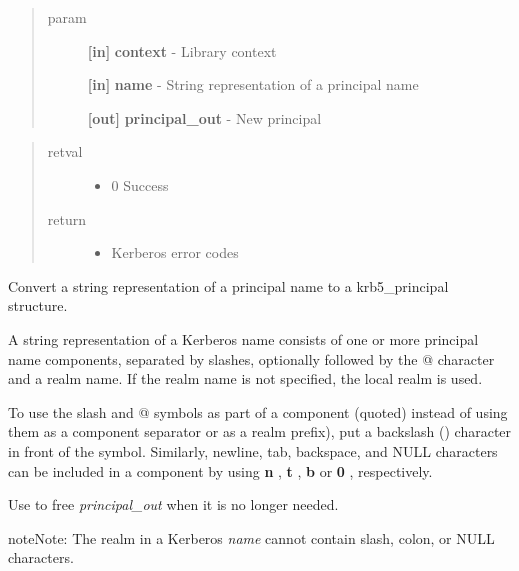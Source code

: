 \documentclass[letterpaper,10pt,english]{sphinxmanual}
\begin{document}
\begin{quote}\begin{description}
\item[{param}] \leavevmode
\textbf{{[}in{]}} \textbf{context} - Library context

\textbf{{[}in{]}} \textbf{name} - String representation of a principal name

\textbf{{[}out{]}} \textbf{principal\_out} - New principal

\end{description}\end{quote}
\begin{quote}\begin{description}
\item[{retval}] \leavevmode\begin{itemize}
\item {} 
0   Success

\end{itemize}

\item[{return}] \leavevmode\begin{itemize}
\item {} 
Kerberos error codes

\end{itemize}

\end{description}\end{quote}

Convert a string representation of a principal name to a krb5\_principal structure.

A string representation of a Kerberos name consists of one or more principal name components, separated by slashes, optionally followed by the @ character and a realm name. If the realm name is not specified, the local realm is used.

To use the slash and @ symbols as part of a component (quoted) instead of using them as a component separator or as a realm prefix), put a backslash () character in front of the symbol. Similarly, newline, tab, backspace, and NULL characters can be included in a component by using \textbf{n} , \textbf{t} , \textbf{b} or \textbf{0} , respectively.

Use {\hyperref[appdev/refs/api/krb5_free_principal:krb5_free_principal]{}} to free \emph{principal\_out} when it is no longer needed.

\begin{notice}{note}{Note:}
The realm in a Kerberos \emph{name} cannot contain slash, colon, or NULL characters.
\end{notice}
\end{document}
